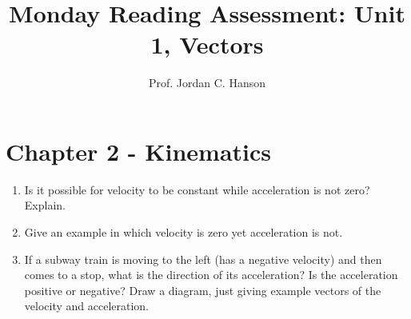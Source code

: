 \documentclass{article}
\begin{document}
\title{Monday Reading Assessment: Unit 1, Vectors}
\author{Prof. Jordan C. Hanson}

\maketitle

\section{Chapter 2 - Kinematics}

\begin{enumerate}
\item Is it possible for velocity to be constant while acceleration is not zero? Explain. \\ \vspace{3cm}
\item Give an example in which velocity is zero yet acceleration is not. \\ \vspace{3cm}
\item If a subway train is moving to the left (has a negative velocity) and then comes to a stop, what is the direction of its
acceleration? Is the acceleration positive or negative?  Draw a diagram, just giving example vectors of the velocity and acceleration.
\end{enumerate}
\end{document}
